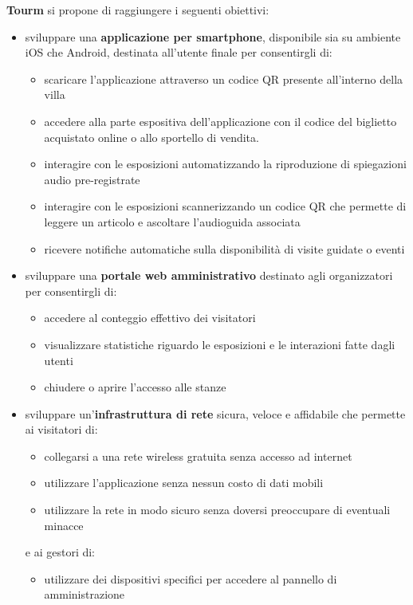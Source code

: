 \documentclass[12pt]{article}
\begin{document}
\textbf{Tourm} si propone di raggiungere i seguenti obiettivi:
\begin{itemize}
	\item sviluppare una \textbf{applicazione per smartphone}, disponibile sia su ambiente iOS che Android, destinata all’utente finale per consentirgli di:
	\begin{itemize}
	    \item scaricare l'applicazione attraverso un codice QR presente all'interno della villa
		\item accedere alla parte espositiva dell'applicazione con il codice del biglietto acquistato online o allo sportello di vendita.
		\item interagire con le esposizioni automatizzando la riproduzione di spiegazioni audio pre-registrate
		\item interagire con le esposizioni scannerizzando un codice QR che permette di leggere un articolo e ascoltare l'audioguida associata
		\item ricevere notifiche automatiche sulla disponibilità di visite guidate o eventi
	\end{itemize}
    \item sviluppare una \textbf{portale web amministrativo} destinato agli organizzatori per consentirgli di:
	\begin{itemize}
	    \item accedere al conteggio effettivo dei visitatori
		\item visualizzare statistiche riguardo le esposizioni e le interazioni fatte dagli utenti 
		\item chiudere o aprire l’accesso alle stanze
	\end{itemize}
    \item sviluppare un'\textbf{infrastruttura di rete} sicura, veloce e affidabile che permette ai visitatori di:
    \begin{itemize}
        \item collegarsi a una rete wireless gratuita senza accesso ad internet
        \item utilizzare l'applicazione senza nessun costo di dati mobili
        \item utilizzare la rete in modo sicuro senza doversi preoccupare di eventuali minacce
    \end{itemize}
    e ai gestori di: 
    \begin{itemize}
        \item utilizzare dei dispositivi specifici per accedere al pannello di amministrazione
    \end{itemize}
\end{itemize}
\end{document}
